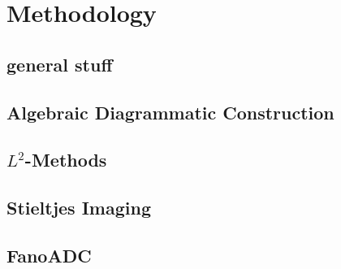 \chapter{Methodology}
\section{general stuff}
\section{Algebraic Diagrammatic Construction}
\section{$L^2$-Methods}
\section{Stieltjes Imaging}
\section{FanoADC}
